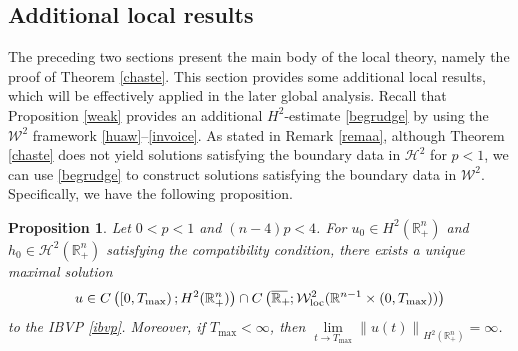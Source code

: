 \documentclass[preprint,compress,12pt]{elsarticle}
\newtheorem{proposition}[theorem]{Proposition}
\numberwithin{equation}{section}
\begin{document}
\subsection{Additional local results}\label{stipple}
The preceding two sections present the main body of the local theory, namely the proof of Theorem \ref{chaste}. This section provides some additional local results, which will be effectively applied in the later global analysis. Recall that Proposition \ref{weak} provides an additional $H^{2}$-estimate \eqref{begrudge} by using the $\mathcal{W}^{2}$ framework \eqref{huaw}--\eqref{invoice}. As stated in Remark \ref{remaa}, although Theorem \ref{chaste} does not yield solutions satisfying the boundary data in  $\mathcal{H}^2$ for $ p < 1$, we can use \eqref{begrudge} to construct  solutions satisfying the boundary data in  $\mathcal{W}^2$. Specifically, we have the following proposition.
\begin{proposition}\label{weak2}
	Let $0<p<1$ and $(n-4)p<4$. For $u_{0}\in H^{2}(\mathbb{R}^{n}_{+})$ and $h_{0}\in\mathcal{H}^{2}(\mathbb{R}_{+}^{n})$ satisfying the compatibility condition, there exists a unique maximal solution
	\begin{equation}\label{ew}
		u\in C\left(\left[0,T_{\max}\right);H^{2}(\mathbb{R}^{n}_{+})\right)\cap C\left(\overline{\mathbb{R}_{+}\mkern-4mu}\,;\mathcal{W}^{2}_{\mathrm{loc}}(\mathbb{R}^{n-1}\times(0,T_{\max}))\right)
	\end{equation}
	to the IBVP \eqref{ibvp}. Moreover, if $T_{\max}< \infty$, then $\lim\limits_{t\rightarrow T_{\max}} \left\|u(t)\right\|_{H^{2}(\mathbb{R}^{n}_{+})}=\infty$.
\end{proposition}
\end{document}
